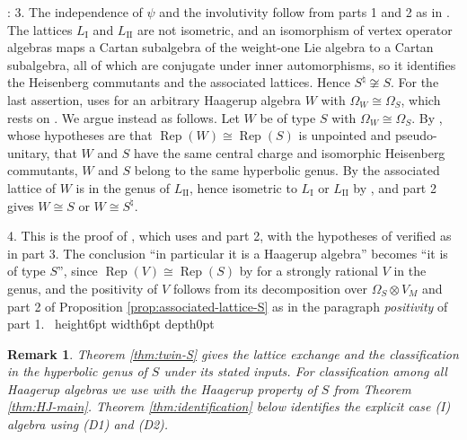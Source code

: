 \documentclass[leqno]{article}
\newcommand{\qed}{\hfill \vrule height6pt  width6pt depth0pt}
\newcommand{\ot}{\otimes}
\DeclareMathOperator{\Rep}{Rep}
\newtheorem{remark}[thm]{Remark}
\newenvironment{proof}[1][]{\noindent {\it Proof #1} : }{\hbox{~}\qed
\smallskip
}
\numberwithin{equation}{section}
\begin{document}
\begin{proof}
3. The independence of $\psi$ and the involutivity follow from parts 1 and 2 as in \cite{Arh26}. The lattices $L_{\mathrm I}$ and $L_{\mathrm{II}}$ are not isometric, and an isomorphism of vertex operator algebras maps a Cartan subalgebra of the weight-one Lie algebra to a Cartan subalgebra, all of which are conjugate under inner automorphisms, so it identifies the Heisenberg commutants and the associated lattices. Hence $S^\natural \not\cong S$. For the last assertion, \cite{Arh26} uses \cite[Proposition 12.2(3)]{Arh26} for an arbitrary Haagerup algebra $W$ with $\Omega_W \cong \Omega_S$, which rests on \cite[Theorem 8.5]{Arh26}. We argue instead as follows. Let $W$ be of type $S$ with $\Omega_W \cong \Omega_S$. By \cite[Corollary 4.10]{MoR24a}, whose hypotheses are that $\Rep(W) \cong \Rep(S)$ is unpointed and pseudo-unitary, that $W$ and $S$ have the same central charge and isomorphic Heisenberg commutants, $W$ and $S$ belong to the same hyperbolic genus. By \cite[Definition 4.6 and Theorem 4.7]{MoR24a} the associated lattice of $W$ is in the genus of $L_{\mathrm{II}}$, hence isometric to $L_{\mathrm I}$ or $L_{\mathrm{II}}$ by \cite[Lemma 12.1(2)]{Arh26}, and part 2 gives $W \cong S$ or $W \cong S^\natural$.

4. This is the proof of \cite[Theorem 12.3(4)]{Arh26}, which uses \cite[Corollary 4.10 and Theorems 4.7, 4.8]{MoR24a} and part 2, with the hypotheses of \cite[Corollary 4.10]{MoR24a} verified as in part 3. The conclusion ``in particular it is a Haagerup algebra'' becomes ``it is of type $S$'', since $\Rep(V) \cong \Rep(S)$ by \cite[Theorem 4.8]{MoR24a} for a strongly rational $V$ in the genus, and the positivity of $V$ follows from its decomposition over $\Omega_S \ot V_M$ and part 2 of Proposition \ref{prop:associated-lattice-S} as in the paragraph \emph{positivity} of part 1.
\end{proof}

\begin{remark}\normalfont
\label{rem:twin-not-covered}
Theorem \ref{thm:twin-S} gives the lattice exchange and the classification in the hyperbolic genus of $S$ under its stated inputs. For classification among all Haagerup algebras we use \cite[Theorem 12.4(1),(4)]{Arh26} with the Haagerup property of $S$ from Theorem \ref{thm:HJ-main}. Theorem \ref{thm:identification} below identifies the explicit case (I) algebra using (D1) and (D2).
\end{remark}


\end{document}
